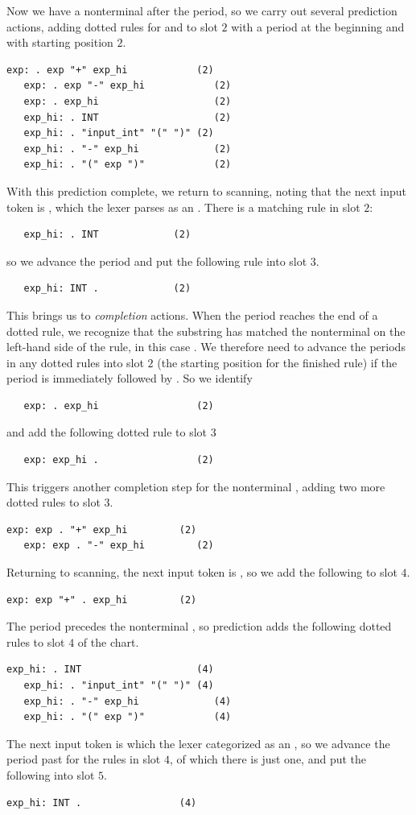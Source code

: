 \documentclass[7x10]{TimesAPriori_MIT}%
\numberwithin{theorem}{chapter}
\numberwithin{definition}{chapter}
\numberwithin{equation}{chapter}
\begin{document}
{Now we have a nonterminal after the period, so we carry out several
prediction actions, adding dotted rules for  and
 to slot $2$ with a period at the beginning and with
starting position $2$.
\begin{lstlisting}[escapechar=$]
   exp: . exp "+" exp_hi            (2)
   exp: . exp "-" exp_hi            (2)
   exp: . exp_hi                    (2)
   exp_hi: . INT                    (2)
   exp_hi: . "input_int" "(" ")" (2)
   exp_hi: . "-" exp_hi             (2)
   exp_hi: . "(" exp ")"            (2)
\end{lstlisting}
With this prediction complete, we return to scanning, noting that the
next input token is , which the lexer parses as an
. There is a matching rule in slot $2$:
\begin{lstlisting}
   exp_hi: . INT             (2)
\end{lstlisting}
so we advance the period and put the following rule into slot $3$.
\begin{lstlisting}
   exp_hi: INT .             (2)
\end{lstlisting}
This brings us to \emph{completion} actions.  When the period reaches
the end of a dotted rule, we recognize that the substring
has matched the nonterminal on the left-hand side of the rule, in this case
. We therefore need to advance the periods in any dotted
rules into slot $2$ (the starting position for the finished rule) if
the period is immediately followed by . So we identify
\begin{lstlisting}
   exp: . exp_hi                 (2)
\end{lstlisting}
and add the following dotted rule to slot $3$
\begin{lstlisting}
   exp: exp_hi .                 (2)
\end{lstlisting}
This triggers another completion step for the nonterminal ,
adding two more dotted rules to slot $3$.
\begin{lstlisting}[escapechar=$]
   exp: exp . "+" exp_hi         (2)
   exp: exp . "-" exp_hi         (2)
\end{lstlisting}

Returning to scanning, the next input token is , so
we add the following to slot $4$.
\begin{lstlisting}[escapechar=$]
   exp: exp "+" . exp_hi         (2)
\end{lstlisting}
The period precedes the nonterminal , so prediction adds
the following dotted rules to slot $4$ of the chart.
\begin{lstlisting}[escapechar=$]
   exp_hi: . INT                    (4)
   exp_hi: . "input_int" "(" ")" (4)
   exp_hi: . "-" exp_hi             (4)
   exp_hi: . "(" exp ")"            (4)
\end{lstlisting}
The next input token is  which the lexer categorized as an
, so we advance the period past  for the rules in
slot $4$, of which there is just one, and put the following into slot $5$.
\begin{lstlisting}[escapechar=$]
   exp_hi: INT .                 (4)
\end{lstlisting}

}
\end{document}
